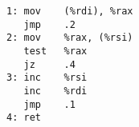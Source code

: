 \documentclass{sigplanconf}
\begin{document}

\lstset{language=[x64]Assembler}
\newsavebox\asmbox
\begin{lrbox}{\asmbox}
\begin{minipage}[b]{4cm}
\begin{lstlisting}[basicstyle=\footnotesize\ttfamily]
1: mov    (%rdi), %rax
   jmp    .2
2: mov    %rax, (%rsi)
   test   %rax
   jz     .4
3: inc    %rsi
   inc    %rdi
   jmp    .1
4: ret
\end{lstlisting}
\end{minipage}
\end{lrbox}
\end{document}
